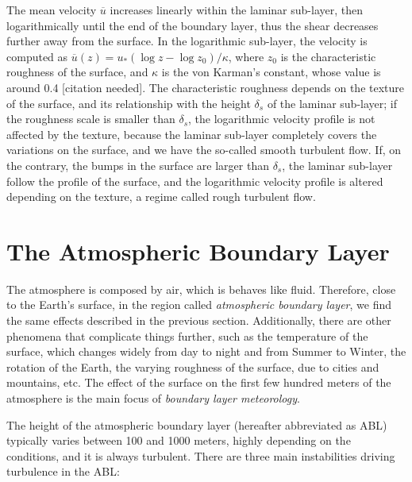 \documentclass[12pt]{book}
\begin{document}
The mean velocity $\overline{u}$ increases linearly within the laminar sub-layer, then logarithmically until the end of the boundary layer, thus the shear decreases further away from the surface. In the logarithmic sub-layer, the velocity is computed as $\overline{u}(z)=u_*(\log z - \log z_0)/\kappa$, where $z_0$ is the characteristic roughness of the surface, and $\kappa$ is the von Karman's constant, whose value is around 0.4 [citation needed]. The characteristic roughness depends on the texture of the surface, and its relationship with the height $\delta_s$ of the laminar sub-layer; if the roughness scale is smaller than $\delta_s$, the logarithmic velocity profile is not affected by the texture, because the laminar sub-layer completely covers the variations on the surface, and we have the so-called smooth turbulent flow. If, on the contrary, the bumps in the surface are larger than $\delta_s$, the laminar sub-layer follow the profile of the surface, and the logarithmic velocity profile is altered depending on the texture, a regime called rough turbulent flow.

\section{The Atmospheric Boundary Layer}
The atmosphere is composed by air, which is behaves like fluid. Therefore, close to the Earth's surface, in the region called \emph{atmospheric boundary layer}, we find the same effects described in the previous section. Additionally, there are other phenomena that complicate things further, such as the temperature of the surface, which changes widely from day to night and from Summer to Winter, the rotation of the Earth, the varying roughness of the surface, due to cities and mountains, etc. The effect of the surface on the first few hundred meters of the atmosphere is the main focus of \emph{boundary layer meteorology}. 

The height of the atmospheric boundary layer (hereafter abbreviated as ABL) typically varies between 100 and 1000 meters, highly depending on the conditions, and it is always turbulent. There are three main instabilities driving turbulence in the ABL:
\end{document}
